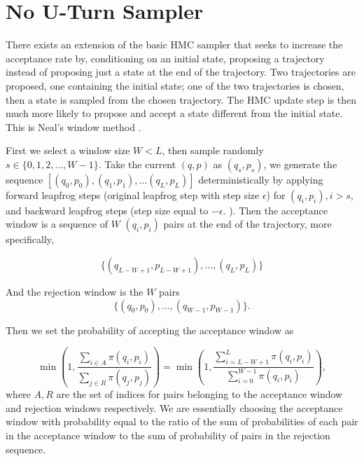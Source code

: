 \documentclass[12pt]{report}
\begin{document}
\section{No U-Turn Sampler}


There exists an extension of the basic HMC sampler that seeks to increase the acceptance
rate by, conditioning on an initial state, proposing a trajectory instead of proposing just a state at the end
of the trajectory. Two trajectories are proposed, one containing the initial state; one
of the two trajectories is chosen, then a state is sampled from the chosen
trajectory. The HMC update step is then much more likely to propose and accept
a state different from the initial state. This is Neal's window
method \cite{neal1992improved}. 

First we select a window size $W < L$, then sample randomly $s \in \{0, 1,2 , \dots , W -1 \}$. Take the current $(q,p)$ as $(q_s, p_s)$, we generate the sequence $[(q_0,p_0),(q_1, p_1), \dots (q_L,p_L)]$ deterministically by applying forward leapfrog steps (original leapfrog step with step size $\epsilon$) for $(q_i,p_i), i > s $, and backward leapfrog steps (step size equal to $-\epsilon$. ). 
Then the acceptance window is a sequence of $W$ $(q_i,p_i)$ pairs at the end of the trajectory, more specifically,

\[ \{(q_{L-W+1},p_{L-W+1}), \dots , (q_L,p_L)\} \]

And the rejection window is the $W$ pairs 
\[ \{(q_0,p_0), \dots, (q_{W-1},p_{W-1})\}. \]

Then we set the probability of accepting the acceptance window as 

\[ \min (1, \frac{\sum_{i\in A} \pi(q_i,p_i)}{\sum_{j \in R} \pi(q_j,p_j) }) = \min (1, \frac{\sum_{i=L-W+1}^L \pi(q_i,p_i)}{\sum_{i=0}^{W-1}\pi(q_i,p_i)}), \]
where $A,R$ are the set of indices for pairs belonging to the acceptance window and rejection windows respectively. We are essentially choosing the acceptance window with probability equal to the ratio of the sum of probabilities of each pair in the acceptance window to the sum of probability of pairs in the rejection sequence. 
\end{document}
